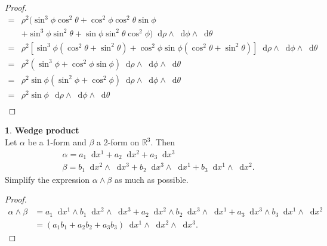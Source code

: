 \documentclass[12pt]{article}
\newcommand{\dd}{\mathop{}\!\mathrm{d}}
\theoremstyle{definition}
\newtheorem{ex}{}[section]
\begin{document}
\begin{proof}
\begin{align*}
		= {}                                 & \rho^2(\sin^3\phi\cos^2\theta + \cos^2\phi\cos^2\theta \sin\phi                                                 \\
		                                     & + \sin^3\phi\sin^2\theta + \sin\phi\sin^2\theta \cos^2\phi) \dd\rho \wedge \dd\phi \wedge \dd\theta             \\ =                        & \rho^2[\sin^3\phi(\cos^2\theta + \sin^2\theta) + \cos^2\phi\sin\phi (\cos^2\theta + \sin^2\theta)] \dd\rho \wedge \dd\phi \wedge \dd\theta \\
		= {}                                 & \rho^2(\sin^3\phi + \cos^2\phi\sin\phi)\dd\rho \wedge \dd\phi \wedge \dd\theta                                  \\
		= {}                                 & \rho^2\sin\phi(\sin^2\phi + \cos^2\phi)\dd\rho \wedge \dd\phi \wedge \dd\theta                                  \\
		= {}                                 & \rho^2\sin\phi \,\dd\rho \wedge \dd\phi \wedge \dd\theta                                                        \\
	\end{align*}
\end{proof}

\begin{ex}
	\textbf{Wedge product} \\
	Let $\alpha$ be a 1-form and $\beta$ a 2-form on $\mathbb{R}^3$. Then \begin{align*}
		 & \alpha = a_1 \dd x^1 + a_2 \dd x^2 + a_3 \dd x^3                                              \\
		 & \beta = b_1 \dd x^2 \wedge \dd x^3 + b_2 \dd x^3 \wedge \dd x^1 + b_3 \dd x^1 \wedge \dd x^2.
	\end{align*}
	Simplify the expression $\alpha \wedge \beta$ as much as possible.
\end{ex}
\begin{proof}
	\begin{align*}
		\alpha \wedge \beta & = a_1 \dd x^1 \wedge b_1 \dd x^2 \wedge \dd x^3 + a_2 \dd x^2 \wedge b_2 \dd x^3 \wedge \dd x^1 + a_3 \dd x^3 \wedge b_3 \dd x^1 \wedge \dd x^2 \\
		                    & = (a_1b_1 + a_2b_2 + a_3b_3)\dd x^1 \wedge \dd x^2 \wedge \dd x^3.
	\end{align*}
\end{proof}
\end{document}
